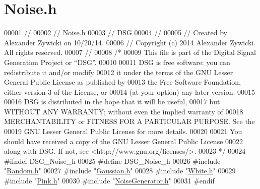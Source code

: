 \hypertarget{_noise_8h_source}{\section{Noise.\+h}
\label{_noise_8h_source}
}

\begin{DoxyCode}
00001 \textcolor{comment}{//}
00002 \textcolor{comment}{//  Noise.h}
00003 \textcolor{comment}{//  DSG}
00004 \textcolor{comment}{//}
00005 \textcolor{comment}{//  Created by Alexander Zywicki on 10/20/14.}
00006 \textcolor{comment}{//  Copyright (c) 2014 Alexander Zywicki. All rights reserved.}
00007 \textcolor{comment}{//}
00008 \textcolor{comment}{/*}
00009 \textcolor{comment}{ This file is part of the Digital Signal Generation Project or “DSG”.}
00010 \textcolor{comment}{}
00011 \textcolor{comment}{ DSG is free software: you can redistribute it and/or modify}
00012 \textcolor{comment}{ it under the terms of the GNU Lesser General Public License as published by}
00013 \textcolor{comment}{ the Free Software Foundation, either version 3 of the License, or}
00014 \textcolor{comment}{ (at your option) any later version.}
00015 \textcolor{comment}{}
00016 \textcolor{comment}{ DSG is distributed in the hope that it will be useful,}
00017 \textcolor{comment}{ but WITHOUT ANY WARRANTY; without even the implied warranty of}
00018 \textcolor{comment}{ MERCHANTABILITY or FITNESS FOR A PARTICULAR PURPOSE.  See the}
00019 \textcolor{comment}{ GNU Lesser General Public License for more details.}
00020 \textcolor{comment}{}
00021 \textcolor{comment}{ You should have received a copy of the GNU Lesser General Public License}
00022 \textcolor{comment}{ along with DSG.  If not, see <http://www.gnu.org/licenses/>.}
00023 \textcolor{comment}{ */}
00024 \textcolor{preprocessor}{#ifndef DSG\_Noise\_h}
00025 \textcolor{preprocessor}{#define DSG\_Noise\_h}
00026 \textcolor{preprocessor}{#include "\hyperlink{_random_8h}{Random.h}"}
00027 \textcolor{preprocessor}{#include "\hyperlink{_gaussian_8h}{Gaussian.h}"}
00028 \textcolor{preprocessor}{#include "\hyperlink{_white_8h}{White.h}"}
00029 \textcolor{preprocessor}{#include "\hyperlink{_pink_8h}{Pink.h}"}
00030 \textcolor{preprocessor}{#include "\hyperlink{_noise_generator_8h}{NoiseGenerator.h}"}
00031 \textcolor{preprocessor}{#endif}
\end{DoxyCode}
